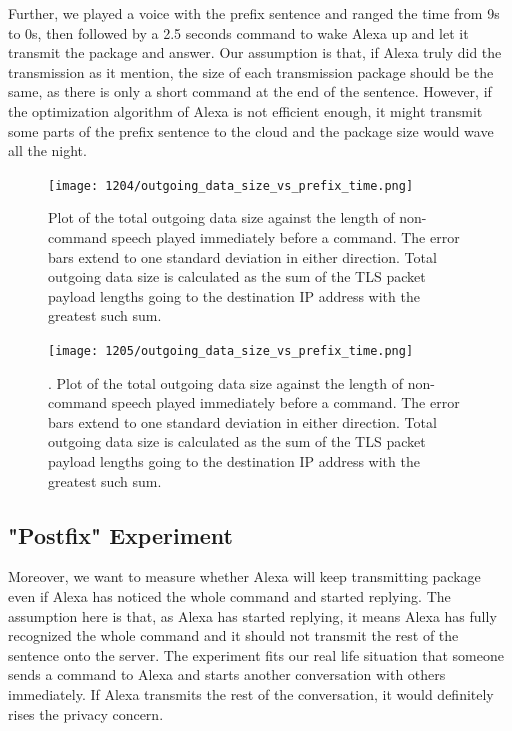Further, we played a voice with the prefix sentence and ranged the time from 9s to 0s, then followed by a 2.5 seconds command to wake Alexa up and let it transmit the package and answer. Our assumption is that, if Alexa truly did the transmission as it mention, the size of each transmission package should be the same, as there is only a short command at the end of the sentence. However, if the optimization algorithm of Alexa is not efficient enough, it might transmit some parts of the prefix sentence to the cloud and the package size would wave all the night.
 

\begin{figure}[]
    \centering
    \texttt{[image: 1204/outgoing\_data\_size\_vs\_prefix\_time.png]}
    \caption{Plot of the total outgoing data size against the length of non-command speech played immediately before a command. The error bars extend to one standard deviation in either direction. Total outgoing data size is calculated as the sum of the TLS packet payload lengths going to the destination IP address with the greatest such sum.}
    \label{fig:prefix_many}
\end{figure}

\begin{figure}[]
    \centering
    \texttt{[image: 1205/outgoing\_data\_size\_vs\_prefix\_time.png]}
    \caption{. Plot of the total outgoing data size against the length of non-command speech played immediately before a command. The error bars extend to one standard deviation in either direction. Total outgoing data size is calculated as the sum of the TLS packet payload lengths going to the destination IP address with the greatest such sum.}
    \label{fig:prefix_two}
\end{figure}








\subsection{"Postfix" Experiment}
  
Moreover, we want to measure whether Alexa will keep transmitting package even if Alexa has noticed the whole command and started replying. The assumption here is that, as Alexa has started replying, it means Alexa has fully recognized the whole command and it should not transmit the rest of the sentence onto the server. The experiment fits our real life situation that someone sends a command to Alexa and starts another conversation with others immediately. If Alexa transmits the rest of the conversation, it would definitely rises the privacy concern.

